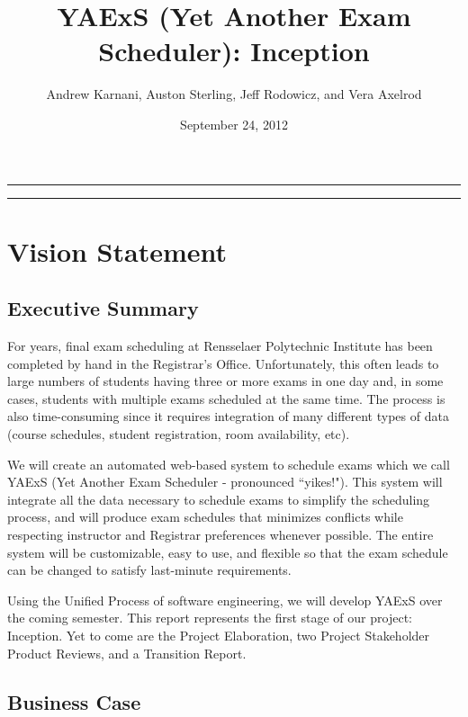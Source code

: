 \documentclass[11pt]{article}
\author{Andrew Karnani, Auston Sterling, Jeff Rodowicz, and Vera Axelrod}
\title{YAExS {(Yet Another Exam Scheduler)}: Inception}
\date{September 24, 2012}
\begin{document}
\maketitle
\vspace{-0.1in}
\hrule

\tableofcontents %

\vspace{0.3in}
\hrule

\section{Vision Statement}
\subsection{Executive Summary} %

For years, final exam scheduling at Rensselaer Polytechnic Institute has been
 completed by hand in the Registrar’s Office.
Unfortunately, this often leads to large numbers of students having three or more
 exams in one day and, in some cases, students with multiple exams scheduled at
 the same time.
 The process is also time-consuming since it requires integration of many different
 types of data (course schedules, student registration, room availability, etc).

We will create an automated web-based system to schedule exams which we call YAExS
(Yet Another Exam Scheduler - pronounced ``yikes!").
This system will integrate all the data necessary to schedule exams to simplify the
scheduling process, and will produce exam schedules that minimizes conflicts
while respecting instructor and Registrar preferences whenever possible.
The entire system will be customizable, easy to use, and flexible
so that the exam schedule can be changed to satisfy last-minute requirements.

Using the Unified Process of software engineering, we will develop YAExS
 over the coming semester.
This report represents the first stage of our project: Inception.
Yet to come are the Project Elaboration, two Project Stakeholder Product Reviews,
 and a Transition Report.


\subsection{Business Case} %
\end{document}
